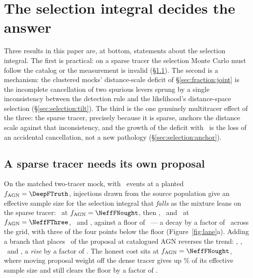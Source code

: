 \section{The selection integral decides the answer}
\label{sec:selection}

Three results in this paper are, at bottom, statements about the selection
integral. The first is practical: on a sparse tracer the selection Monte Carlo
must follow the catalog or the measurement is invalid
(\S\ref{sec:selection:proposal}). The second is a mechanism: the clustered
mocks' distance-scale deficit of \S\ref{sec:fraction:joint} is the incomplete
cancellation of two spurious levers sprung by a single inconsistency between
the detection rule and the likelihood's distance-space selection
(\S\ref{sec:selection:tilt}). The third is the one genuinely multitracer
effect of the three: the sparse tracer, precisely because it is sparse,
anchors the distance scale against that inconsistency, and the growth of the
deficit with \fagn\ is the loss of an accidental cancellation, not a new
pathology (\S\ref{sec:selection:anchor}).

\subsection{A sparse tracer needs its own proposal}
\label{sec:selection:proposal}

On the matched two-tracer mock, with \DeepNobs\ events at a planted
$\fagn = \DeepFTruth$, injections drawn from the source population give an
effective sample size for the selection integral that \emph{falls} as the
mixture leans on the sparse tracer: \NeffPopNought\ at
$\fagn = \NeffFNought$, then
\NeffPopThree, \NeffPopSeven\ and \NeffPopUnity\ at
$\fagn = \NeffFThree$, \NeffFSeven\ and \NeffFUnity, against a floor of
\NeffFloor\ --- a decay by a factor of
\NeffPopDecay\ across the grid, with three of the four points below the floor
(Figure~\ref{fig:lane}a). Adding a branch that places \InjWtgt\ of the proposal
at catalogued AGN reverses the trend: \NeffTgtNought, \NeffTgtThree,
\NeffTgtSeven\ and \NeffTgtUnity, a \emph{rise} by a factor of
\NeffTgtRise. The honest cost sits at $\fagn = \NeffFNought$, where moving proposal weight
off the dense tracer gives up \NeffTgtCostAtZero\% of its effective sample size
and still clears the floor by a factor of \NeffTgtMarginAtZero.

